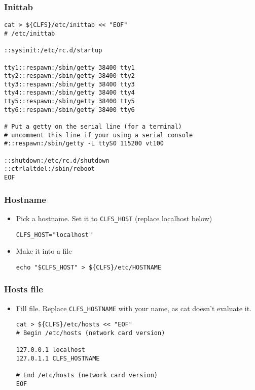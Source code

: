  \subsubsection{Inittab}
\begin{lstlisting}
cat > ${CLFS}/etc/inittab << "EOF"
# /etc/inittab

::sysinit:/etc/rc.d/startup

tty1::respawn:/sbin/getty 38400 tty1
tty2::respawn:/sbin/getty 38400 tty2
tty3::respawn:/sbin/getty 38400 tty3
tty4::respawn:/sbin/getty 38400 tty4
tty5::respawn:/sbin/getty 38400 tty5
tty6::respawn:/sbin/getty 38400 tty6

# Put a getty on the serial line (for a terminal)
# uncomment this line if your using a serial console
#::respawn:/sbin/getty -L ttyS0 115200 vt100

::shutdown:/etc/rc.d/shutdown
::ctrlaltdel:/sbin/reboot
EOF
\end{lstlisting}
 \subsubsection{Hostname}
  \begin{itemize}
  \item Pick a hostname. Set it to \texttt{CLFS\_HOST} (replace localhost below)
\begin{lstlisting}
CLFS_HOST="localhost"
\end{lstlisting}
  \item Make it into a file
\begin{lstlisting}
echo "$CLFS_HOST" > ${CLFS}/etc/HOSTNAME
\end{lstlisting}
 \end{itemize}
 \subsubsection{Hosts file}
  \begin{itemize}
  \item Fill file.
Replace \texttt{CLFS\_HOSTNAME} with your name, as cat  doesn't evaluate it.
\begin{lstlisting}
cat > ${CLFS}/etc/hosts << "EOF"
# Begin /etc/hosts (network card version)

127.0.0.1 localhost
127.0.1.1 CLFS_HOSTNAME

# End /etc/hosts (network card version)
EOF
\end{lstlisting}
\end{itemize}	
